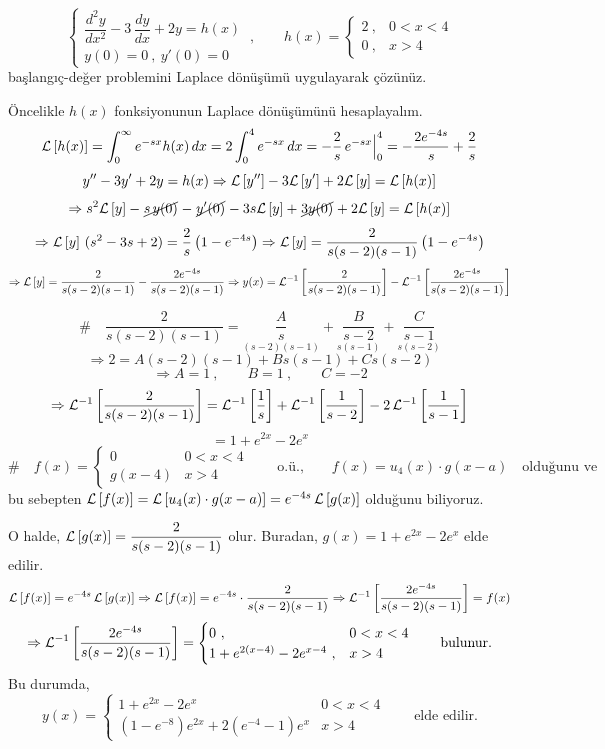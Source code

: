 \documentclass[11pt,a4paper]{article}
\begin{document}
\begin{ornek}[5]
\[
\begin{cases} \dfrac{d^2y}{dx^2} - 3\,\dfrac{dy}{dx} + 2y = h(x) \\[3mm] y(0)=0 \ , \ y'(0)=0 \end{cases} \ , \qquad h(x) = \begin{cases} 2 \ , & 0<x<4 \\ 0 \ , & x>4 \end{cases}
\]
başlangıç-değer problemini Laplace dönüşümü uygulayarak çözünüz.
\end{ornek}
\begin{cozum}
Öncelikle $h(x)$ fonksiyonunun Laplace dönüşümünü hesaplayalım.
\[
\mathcal{L}\left[h(x)\right] = \int_0^\infty e^{-sx}h(x)\,dx = 2\int_0^4 e^{-sx}\,dx = -\frac{2}{s}\,e^{-sx}\Big|_0^4 = -\frac{2e^{-4s}}{s} + \frac{2}{s}
\]
\[
y'' - 3y' + 2y = h(x) \Rightarrow \mathcal{L}\left[y''\right] - 3\mathcal{L}\left[y'\right] + 2\mathcal{L}\left[y\right] = \mathcal{L}\left[h(x)\right]
\]
\[
\Rightarrow s^2\Lk{y} - \carp{s\,y(0)} - \carp{y'(0)} - 3s\Lk{y} + \carp{3y(0)} + 2\Lk{y} = \Lk{h(x)}
\]
\[
\Rightarrow \mathcal{L}\left[y\right]\,(s^2-3s+2) = \frac{2}{s}\left(1-e^{-4s}\right) \Rightarrow \mathcal{L}\left[y\right] = \frac{2}{s(s-2)(s-1)}\left(1-e^{-4s}\right)
\]
\[
\Rightarrow \mathcal{L}\left[y\right] = \frac{2}{s(s-2)(s-1)} - \frac{2e^{-4s}}{s(s-2)(s-1)} \Rightarrow y(x) = \mathcal{L}^{-1}\left[\frac{2}{s(s-2)(s-1)}\right] - \mathcal{L}^{-1}\left[\frac{2e^{-4s}}{s(s-2)(s-1)}\right]
\]

\[
\# \quad \frac{2}{s(s-2)(s-1)} = \underset{(s-2)(s-1)}{\frac{A}{s}} + \underset{s(s-1)}{\frac{B}{s-2}} + \underset{s(s-2)}{\frac{C}{s-1}}
\]
\[
\Rightarrow 2 = A(s-2)(s-1) + Bs(s-1) + Cs(s-2)
\]
\[
\Rightarrow A=1 \ , \qquad B=1 \ , \qquad C=-2
\]
\[
\Rightarrow \mathcal{L}^{-1}\left[\frac{2}{s(s-2)(s-1)}\right] = \mathcal{L}^{-1}\left[\frac1s\right] + \mathcal{L}^{-1}\left[\frac{1}{s-2}\right] - 2\,\mathcal{L}^{-1}\left[\frac{1}{s-1}\right]
\]
\[
= 1 + e^{2x} - 2e^{x}
\]
\[
\# \quad f(x) = \begin{cases} 0 & 0<x<4 \\ g(x-4) & x>4 \end{cases}
\qquad \text{o.ü.,} \qquad f(x) = u_4(x)\cdot g(x-a) \quad \text{olduğunu ve}
\]
bu sebepten $\mathcal{L}\left[f(x)\right] = \mathcal{L}\left[u_4(x)\cdot g(x-a)\right] = e^{-4s}\,\mathcal{L}\left[g(x)\right]$ olduğunu biliyoruz.

O halde, $\mathcal{L}\left[g(x)\right] = \dfrac{2}{s(s-2)(s-1)}$ olur. Buradan, $g(x) = 1+e^{2x}-2e^{x}$ elde edilir.
\[
\mathcal{L}\left[f(x)\right] = e^{-4s}\,\mathcal{L}\left[g(x)\right] \Rightarrow \mathcal{L}\left[f(x)\right] = e^{-4s}\cdot\frac{2}{s(s-2)(s-1)} \Rightarrow \mathcal{L}^{-1}\left[\frac{2e^{-4s}}{s(s-2)(s-1)}\right] = f(x)
\]
\[
\Rightarrow \mathcal{L}^{-1}\left[\frac{2e^{-4s}}{s(s-2)(s-1)}\right] = \begin{cases} 0 \ , & 0<x<4 \\ 1+e^{2(x-4)}-2e^{x-4} \ , & x>4 \end{cases} \qquad \text{bulunur.}
\]
Bu durumda,
\[
y(x) = \begin{cases} 1+e^{2x}-2e^{x} & 0<x<4 \\ (1-e^{-8})e^{2x} + 2\left(e^{-4}-1\right)e^{x} & x>4 \end{cases} \qquad \text{elde edilir.}
\]
\end{cozum}
\end{document}
